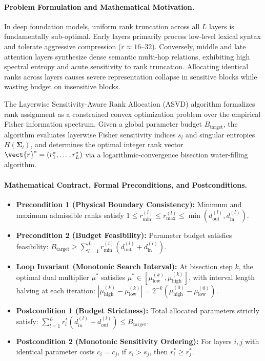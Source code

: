 \paragraph{Problem Formulation and Mathematical Motivation.}
In deep foundation models, uniform rank truncation across all $L$ layers is fundamentally sub-optimal. Early layers primarily process low-level lexical syntax and tolerate aggressive compression ($r \approx 16\text{--}32$). Conversely, middle and late attention layers synthesize dense semantic multi-hop relations, exhibiting high spectral entropy and acute sensitivity to rank truncation. Allocating identical ranks across layers causes severe representation collapse in sensitive blocks while wasting budget on insensitive blocks.

The Layerwise Sensitivity-Aware Rank Allocation (ASVD) algorithm formalizes rank assignment as a constrained convex optimization problem over the empirical Fisher information spectrum. Given a global parameter budget $B_{\text{target}}$, the algorithm evaluates layerwise Fisher sensitivity indices $s_l$ and singular entropies $H(\bm{\Sigma}_l)$, and determines the optimal integer rank vector $\vect{r}^* = (r_1^*, \dots, r_L^*)$ via a logarithmic-convergence bisection water-filling algorithm.

\paragraph{Mathematical Contract, Formal Preconditions, and Postconditions.}
\begin{itemize}
    \item \textbf{Precondition 1 (Physical Boundary Consistency):} Minimum and maximum admissible ranks satisfy $1 \le r_{\min}^{(l)} \le r_{\max}^{(l)} \le \min(d_{\text{out}}^{(l)}, d_{\text{in}}^{(l)})$.
    \item \textbf{Precondition 2 (Budget Feasibility):} Parameter budget satisfies feasibility: $B_{\text{target}} \ge \sum_{l=1}^L r_{\min}^{(l)} (d_{\text{out}}^{(l)} + d_{\text{in}}^{(l)})$.
    \item \textbf{Loop Invariant (Monotonic Search Interval):} At bisection step $k$, the optimal dual multiplier $\mu^*$ satisfies $\mu^* \in [\mu_{\text{low}}^{(k)}, \mu_{\text{high}}^{(k)}]$, with interval length halving at each iteration: $|\mu_{\text{high}}^{(k)} - \mu_{\text{low}}^{(k)}| = 2^{-k} (\mu_{\text{high}}^{(0)} - \mu_{\text{low}}^{(0)})$.
    \item \textbf{Postcondition 1 (Budget Strictness):} Total allocated parameters strictly satisfy: $\sum_{l=1}^L r_l^* (d_{\text{in}}^{(l)} + d_{\text{out}}^{(l)}) \le B_{\text{target}}$.
    \item \textbf{Postcondition 2 (Monotonic Sensitivity Ordering):} For layers $i, j$ with identical parameter costs $c_i = c_j$, if $s_i > s_j$, then $r_i^* \ge r_j^*$.
\end{itemize}

